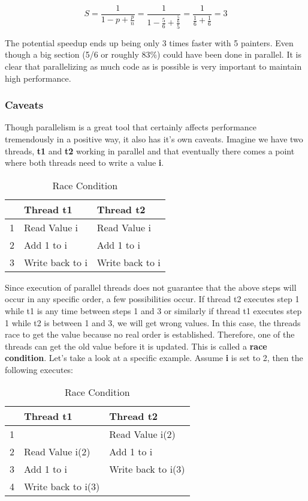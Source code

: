 \documentclass[letterpaper, 12pt]{article}
\begin{document}
\begin{equation}
	S = \frac{1}{1-p+\frac{p}{n}} = \frac{1}{1-\frac{5}{6}+\frac{\frac{5}{6}}{5}} = \frac{1}{\frac{1}{6}+\frac{1}{6}} = 3
\end{equation}

The potential speedup ends up being only 3 times faster with 5 painters. Even though a big section 
(5/6 or roughly 83\%) could have been done in parallel. It is clear that parallelizing as much 
code as is possible is very important to maintain high performance. 

\subsubsection{Caveats}

Though parallelism is a great tool that certainly affects performance tremendously in a positive way, 
it also has it's own caveats. Imagine we have two threads, {\bfseries t1} and {\bfseries t2} 
working in parallel and that eventually there comes a point where both threads need to write a value {\bfseries i}.


\begin{table}[h]
\centering
\caption{Race Condition}
\begin{tabular}{|l|l|l|}
	\hline
	& {\bfseries Thread t1} & {\bfseries Thread t2} \\
	\hline
	1 & Read Value i & Read Value i \\
	\hline
	2 & Add 1 to i & Add 1 to i \\
	\hline
	3 & Write back to i & Write back to i \\
	\hline 
\end{tabular}
\end{table}

Since execution of parallel threads does not guarantee that the above steps will occur in 
any specific order, a few possibilities occur. If thread t2 executes step 1 while 
t1 is any time between steps 1 and 3 or similarly if thread t1 executes step 1 while 
t2 is between 1 and 3, we will get wrong values. In this case, the threads race 
to get the value because no real order is established. Therefore, one of the 
threads can get the old value before it is updated. This is called a {\bfseries race condition}. 
Let's take a look at a specific example. Assume {\bfseries i} is set to 2, 
then the following executes:

\begin{table}[h]
\centering
\caption{Race Condition}
\begin{tabular}{|l|l|l|}
	\hline
	& {\bfseries Thread t1} & {\bfseries Thread t2} \\
	\hline
	1 &  & Read Value i(2) \\
	\hline
	2 & Read Value i(2) & Add 1 to i \\
	\hline
	3 & Add 1 to i & Write back to i(3) \\
	\hline
	4 & Write back to i(3) &  \\
	\hline 
\end{tabular}
\end{table}
\end{document}
